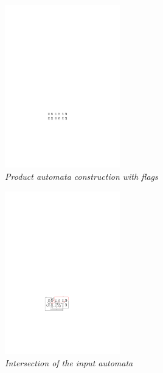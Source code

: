   \begin{figure}
\begin{center}
\includegraphics[width=50mm]{state_copy.pdf}
\end{center}
\caption{{\em Product automata construction with flags}}
\label{fig:copy}
\end{figure}

 
 \begin{figure}
\begin{center}
\includegraphics[width=50mm]{state_copy_transition.pdf}
\end{center}
\caption{{\em Intersection of the input automata}}
\label{transition}
\end{figure}

\begin{figure}
\begin{center}
\end{center}
\label{fig:Algorithm}
\end{figure}

